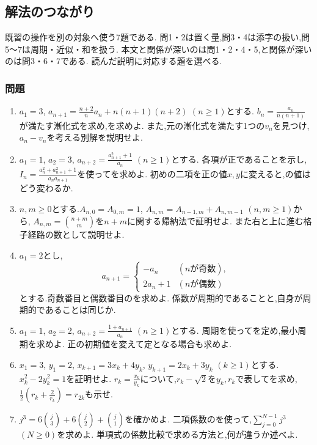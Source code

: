 \subsection{解法のつながり}\label{節：解法のつながり}
既習の操作を別の対象へ使う7題である.
問1・2は置く量,問3・4は添字の扱い,問5〜7は周期・近似・和を扱う.
本文と関係が深いのは問1・2・4・5,と関係が深いのは問3・6・7である.
読んだ説明に対応する題を選べる.

\subsubsection{問題}
\begin{enumerate}[label=\textbf{問\arabic*.},format=\bookitemlink{practice-connections}{problem}{answer}]
  \item $a_1=3$,
    $a_{n+1}=\frac{n+2}{n}a_n+n(n+1)(n+2)$ $(n\ge1)$とする.
    $b_n=\frac{a_n}{n(n+1)}$が満たす漸化式を求め,を求めよ.
    また,元の漸化式を満たす1つの$v_n$を見つけ,
    $a_n-v_n$を考える別解を説明せよ.
  \item $a_1=1$, $a_2=3$,
    $a_{n+2}=\frac{a_{n+1}^2+1}{a_n}$ $(n\ge1)$とする.
    各項が正であることを示し,
    $I_n=\frac{a_n^2+a_{n+1}^2+1}{a_na_{n+1}}$を使ってを求めよ.
    初めの二項を正の値$x,y$に変えると,の値はどう変わるか.
  \item $n,m\ge0$とする.$A_{n,0}=A_{0,m}=1$,
    $A_{n,m}=A_{n-1,m}+A_{n,m-1}$ $(n,m\ge1)$から,
    $A_{n,m}=\binom{n+m}{m}$を$n+m$に関する帰納法で証明せよ.
    また右と上に進む格子経路の数として説明せよ.
  \item $a_1=2$とし,
    \[
      a_{n+1}=\begin{cases}
        -a_n&(n\text{が奇数}),\\
        2a_n+1&(n\text{が偶数})
      \end{cases}
    \]
    とする.奇数番目と偶数番目のを求めよ.
    係数が周期的であることと,自身が周期的であることは同じか.
  \item $a_1=1$, $a_2=2$,
    $a_{n+2}=\frac{1+a_{n+1}}{a_n}$ $(n\ge1)$とする.
    周期を使ってを定め,最小周期を求めよ.
    正の初期値を変えて定となる場合も求めよ.
  \item $x_1=3$, $y_1=2$,
    $x_{k+1}=3x_k+4y_k$, $y_{k+1}=2x_k+3y_k$ $(k\ge1)$とする.
    $x_k^2-2y_k^2=1$を証明せよ.
    $r_k=\frac{x_k}{y_k}$について,$r_k-\sqrt2$を$y_k,r_k$で表してを求め,
    $\frac12\left(r_k+\frac{2}{r_k}\right)=r_{2k}$も示せ.
  \item $j^3=6\binom j3+6\binom j2+\binom j1$を確かめよ.
    二項係数のを使って,$\sum_{j=0}^{N-1}j^3$ $(N\ge0)$を求めよ.
    単項式の係数比較で求める方法と,何が違うか述べよ.
\end{enumerate}

